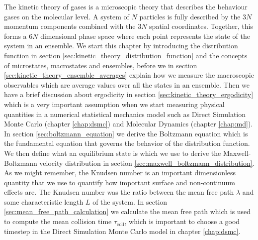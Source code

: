 The kinetic theory of gases is a microscopic theory that describes the behaviour gases on the molecular level. A system of $N$ particles is fully described by the $3N$ momentum components combined with the $3N$ spatial coordinates. Together, this forms a $6N$ dimensional phase space where each point represents the state of the system in an ensemble. We start this chapter by introducing the distribution function in section \ref{sec:kinetic_theory_distribution_function} and the concepts of microstates, macrostates and ensembles, before we in section \ref{sec:kinetic_theory_ensemble_averages} explain how we measure the macroscopic observables which are average values over all the states in an ensemble. Then we have a brief discussion about ergodicity in section \ref{sec:kinetic_theory_ergodicity} which is a very important assumption when we start measuring physical quantities in a numerical statistical mechanics model such as Direct Simulation Monte Carlo (chapter \ref{chap:dsmc}) and Molecular Dynamics (chapter \ref{chap:md}).\\
In section \ref{sec:boltzmann_equation} we derive the Boltzmann equation which is the fundamental equation that governs the behavior of the distribution function. We then define what an equilibrium state is which we use to derive the Maxwell-Boltzmann velocity distribution in section \ref{sec:maxwell_boltzmann_distribution}. As we might remember, the Knudsen number is an important dimensionless quantity that we use to quantify how important surface and non-continuum effects are. The Knudsen number was the ratio between the mean free path $\lambda$ and some characteristic length $L$ of the system. In section \ref{sec:mean_free_path_calculation} we calculate the mean free path which is used to compute the mean collision time $\tau_\text{coll}$, which is important to choose a good timestep in the Direct Simulation Monte Carlo model in chapter \ref{chap:dsmc}.
